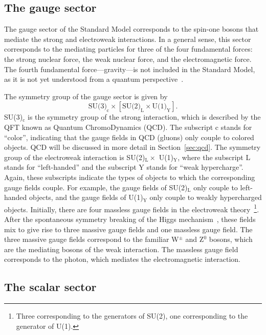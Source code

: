 \subsection{The gauge sector}
\label{sec:gauge_fields}

The gauge sector of the Standard Model corresponds to the spin-one bosons that mediate the strong and electroweak interactions. In a general sense, this sector corresponds to the mediating particles for three of the four fundamental forces: the strong nuclear force, the weak nuclear force, and the electromagnetic force. The fourth fundamental force---gravity---is not included in the Standard Model, as it is not yet understood from a quantum perspective~\cite{QuantumGravity}.

The symmetry group of the gauge sector is given by
%
\begin{equation}
    \label{eq:gauge_symmetry}
    \text{SU(3)}_\text{c} \times \left[\text{SU(2)}_\text{L} \times \text{U(1)}_\text{Y}\right].
\end{equation}
%
SU(3)$_\text{c}$ is the symmetry group of the strong interaction, which is described by the QFT known as Quantum ChromoDynamics (QCD). The subscript c stands for ``color'', indicating that the gauge fields in QCD (gluons) only couple to colored objects. QCD will be discussed in more detail in Section~\ref{sec:qcd}. The symmetry group of the electroweak interaction is SU(2)$_\text{L} \times$ U(1)$_\text{Y}$, where the subscript L stands for ``left-handed'' and the subscript Y stands for ``weak hypercharge''. Again, these subscripts indicate the types of objects to which the corresponding gauge fields couple. For example, the gauge fields of SU(2)$_\text{L}$ only couple to left-handed objects, and the gauge fields of U(1)$_\text{Y}$ only couple to weakly hypercharged objects. Initially, there are four massless gauge fields in the electroweak theory~\footnote{Three corresponding to the generators of SU(2), one corresponding to the generator of U(1).}. After the spontaneous symmetry breaking of the Higgs mechanism~\cite{HiggsPaper}, these fields mix to give rise to three massive gauge fields and one massless gauge field. The three massive gauge fields correspond to the familiar W$^{\pm}$ and Z$^{0}$ bosons, which are the mediating bosons of the weak interaction. The massless gauge field corresponds to the photon, which mediates the electromagnetic interaction.

\subsection{The scalar sector}
\label{sec:scalar_fields}

